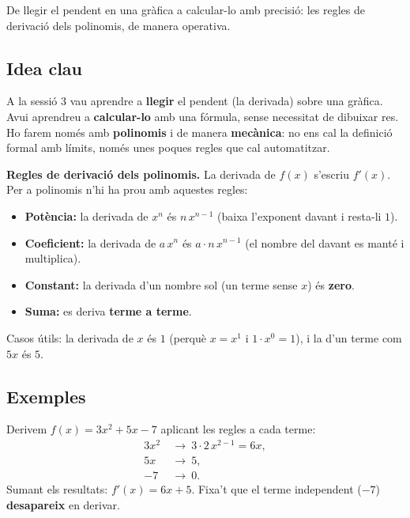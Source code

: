 %
{De llegir el pendent en una gràfica a calcular-lo amb precisió: les regles de derivació dels polinomis, de manera operativa.}

\subsection{Idea clau}

A la sessió 3 vau aprendre a \textbf{llegir} el pendent (la derivada) sobre una
gràfica. Avui aprendreu a \textbf{calcular-lo} amb una fórmula, sense necessitat de
dibuixar res. Ho farem només amb \textbf{polinomis} i de manera \textbf{mecànica}: no
ens cal la definició formal amb límits, només unes poques regles que cal automatitzar.

\begin{idea}
\textbf{Regles de derivació dels polinomis.} La derivada de $f(x)$ s'escriu
$f'(x)$. Per a polinomis n'hi ha prou amb aquestes regles:
\begin{itemize}[leftmargin=1.4em, itemsep=3pt]
  \item \textbf{Potència:} la derivada de $x^n$ és $n\,x^{n-1}$
        (baixa l'exponent davant i resta-li $1$).
  \item \textbf{Coeficient:} la derivada de $a\,x^n$ és $a\cdot n\,x^{n-1}$
        (el nombre del davant es manté i multiplica).
  \item \textbf{Constant:} la derivada d'un nombre sol (un terme sense $x$) és
        \textbf{zero}.
  \item \textbf{Suma:} es deriva \textbf{terme a terme}.
\end{itemize}
Casos útils: la derivada de $x$ és $1$ (perquè $x=x^1$ i $1\cdot x^0=1$), i la d'un
terme com $5x$ és $5$.
\end{idea}

\subsection{Exemples}

\begin{exemple}
Derivem $f(x)=3x^2+5x-7$ aplicant les regles a cada terme:
\begin{align*}
3x^2 &\ \to\ 3\cdot 2\,x^{2-1}=6x,\\
5x   &\ \to\ 5,\\
-7   &\ \to\ 0.
\end{align*}
Sumant els resultats: $f'(x)=6x+5$. Fixa't que el terme independent ($-7$)
\textbf{desapareix} en derivar.
\end{exemple}

